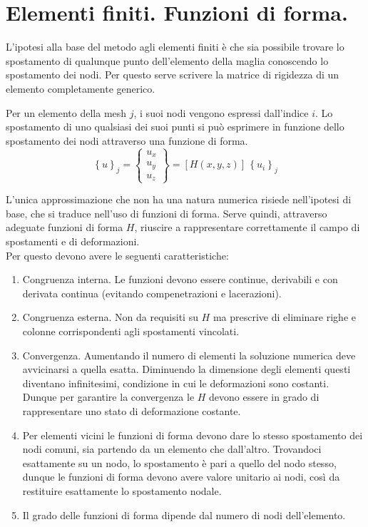 \section{Elementi finiti. Funzioni di forma.}

L'ipotesi alla base del metodo agli elementi finiti è che sia possibile trovare lo spostamento di qualunque punto dell'elemento della maglia conoscendo lo spostamento dei nodi. Per questo serve scrivere la matrice di rigidezza di un elemento completamente generico.

Per un elemento della mesh $j$, i suoi nodi vengono espressi dall'indice $i$. Lo spostamento di uno qualsiasi dei suoi punti si può esprimere in funzione dello spostamento dei nodi attraverso una funzione di forma.
\begin{equation*}
    \left\{u \right\}_j = \begin{Bmatrix}
        u_x\\u_y\\u_z 
    \end{Bmatrix}= [H(x,y,z)] \,\left\{u_i \right\}_j
\end{equation*}

L'unica approssimazione che non ha una natura numerica risiede nell'ipotesi di base, che si traduce nell'uso di funzioni di forma. Serve quindi, attraverso adeguate funzioni di forma $H$, riuscire a rappresentare correttamente il campo di spostamenti e di deformazioni. \\Per questo devono avere le seguenti caratteristiche:
\begin{enumerate}
    \item Congruenza interna. Le funzioni devono essere continue, derivabili e con derivata continua (evitando compenetrazioni e lacerazioni).\\
    \item Congruenza esterna. Non da requisiti su $H$ ma prescrive di eliminare righe e colonne corrispondenti agli spostamenti vincolati.\\
    \item Convergenza. Aumentando il numero di elementi la soluzione numerica deve avvicinarsi a quella esatta. Diminuendo la dimensione degli elementi questi diventano infinitesimi, condizione in cui le deformazioni sono costanti. Dunque per garantire la convergenza le $H $ devono essere in grado di rappresentare uno stato di deformazione costante.\\
    \item Per elementi vicini le funzioni di forma devono dare lo stesso spostamento dei nodi comuni, sia partendo da un elemento che dall'altro. Trovandoci esattamente su un nodo, lo spostamento è pari a quello del nodo stesso, dunque le funzioni di forma devono avere valore unitario ai nodi, così da restituire esattamente lo spostamento nodale.\\
    \item Il grado delle funzioni di forma dipende dal numero di nodi dell'elemento.
\end{enumerate}
